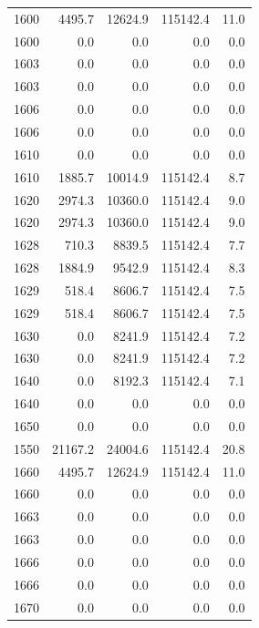 \begin{longtable}{rrrrr}
    1600 & \num{4495.7} & \num{12624.9} & \num{115142.4} & 11.0 \\
    1600 & \num{0.0} & \num{0.0} & \num{0.0} & 0.0 \\
    1603 & \num{0.0} & \num{0.0} & \num{0.0} & 0.0 \\
    1603 & \num{0.0} & \num{0.0} & \num{0.0} & 0.0 \\
    1606 & \num{0.0} & \num{0.0} & \num{0.0} & 0.0 \\
    1606 & \num{0.0} & \num{0.0} & \num{0.0} & 0.0 \\
    1610 & \num{0.0} & \num{0.0} & \num{0.0} & 0.0 \\
    1610 & \num{1885.7} & \num{10014.9} & \num{115142.4} & 8.7 \\
    1620 & \num{2974.3} & \num{10360.0} & \num{115142.4} & 9.0 \\
    1620 & \num{2974.3} & \num{10360.0} & \num{115142.4} & 9.0 \\
    1628 & \num{710.3} & \num{8839.5} & \num{115142.4} & 7.7 \\
    1628 & \num{1884.9} & \num{9542.9} & \num{115142.4} & 8.3 \\
    1629 & \num{518.4} & \num{8606.7} & \num{115142.4} & 7.5 \\
    1629 & \num{518.4} & \num{8606.7} & \num{115142.4} & 7.5 \\
    1630 & \num{0.0} & \num{8241.9} & \num{115142.4} & 7.2 \\
    1630 & \num{0.0} & \num{8241.9} & \num{115142.4} & 7.2 \\
    1640 & \num{0.0} & \num{8192.3} & \num{115142.4} & 7.1 \\
    1640 & \num{0.0} & \num{0.0} & \num{0.0} & 0.0 \\
    1650 & \num{0.0} & \num{0.0} & \num{0.0} & 0.0 \\
    1550 & \num{21167.2} & \num{24004.6} & \num{115142.4} & 20.8 \\
    1660 & \num{4495.7} & \num{12624.9} & \num{115142.4} & 11.0 \\
    1660 & \num{0.0} & \num{0.0} & \num{0.0} & 0.0 \\
    1663 & \num{0.0} & \num{0.0} & \num{0.0} & 0.0 \\
    1663 & \num{0.0} & \num{0.0} & \num{0.0} & 0.0 \\
    1666 & \num{0.0} & \num{0.0} & \num{0.0} & 0.0 \\
    1666 & \num{0.0} & \num{0.0} & \num{0.0} & 0.0 \\
    1670 & \num{0.0} & \num{0.0} & \num{0.0} & 0.0 \\

\end{longtable}
